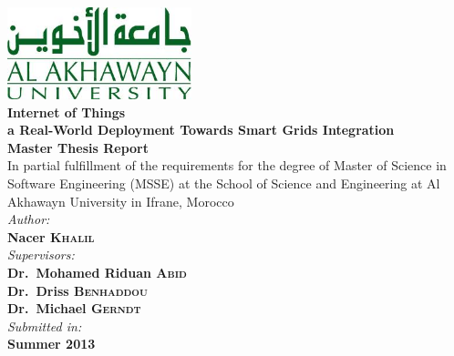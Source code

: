 \begin{titlepage}
\begin{center}
\includegraphics[width=0.4\textwidth]{img/aui_logo.jpg}
\\
{ \huge \bfseries Internet of Things
\\ a Real-World Deployment Towards Smart Grids Integration}\\[1.0cm]
{ \Large \bfseries Master Thesis Report}\\[1.0cm]

In partial fulfillment of the requirements for the degree of Master of Science in Software Engineering (MSSE) at the School of Science and Engineering at Al Akhawayn University in Ifrane, Morocco \\[1.0cm]


\emph{Author:}\\
{\large \textbf{Nacer \textsc{Khalil}}}\\[1.0cm]

\emph{Supervisors:} \\
{\large \textbf{Dr.~Mohamed Riduan \textsc{Abid}}} \\
{\large \textbf{Dr.~Driss \textsc{Benhaddou}}} \\
{\large \textbf{Dr.~Michael \textsc{Gerndt}}} \\[1.0cm]

\vfill
\emph{Submitted in:}\\
{\large \textbf{Summer 2013}} \\
\end{center}
\end{titlepage}
